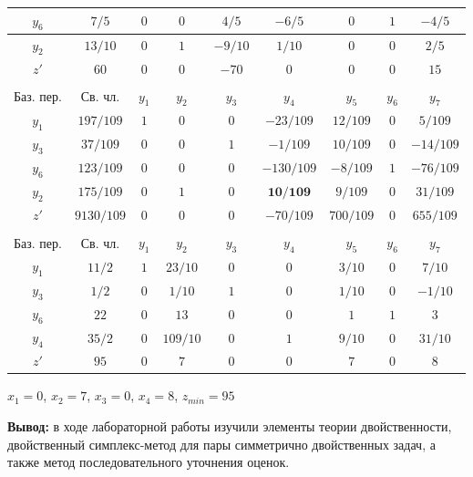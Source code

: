 \documentclass[a4paper,14pt]{extarticle}
\begin{document}
\begin{center}
\begin{longtable}{|c|c|c|c|c|c|c|c|c|}
        \hline
        $y_6$     & $7/5$      & $0$      & $0$      & $4/5$    & $-6/5$     & $0$       & $1$   & $-4/5$    \\
        \hline
        $y_2$     & $13/10$    & $0$      & $1$      & $-9/10$  & $1/10$     & $0$       & $0$   & $2/5$     \\
        \hline
        $z'$      & $60$       & $0$      & $0$      & $-70$    & $0$        & $0$       & $0$   & $15$      \\
        \hline
        \multicolumn{9}{c}{}                                                                                 \\
        \hline
        Баз. пер. & Св. чл.    & $y_1$    & $y_2$    & $y_3$    & $y_4 $     & $y_5$     & $y_6$ & $y_7$     \\
        \hline
        $y_1$     & $197/109$  & $1$      & $0$      & $0$      & $-23/109$  & $12/109$  & $0$   & $5/109$   \\
        \hline
        $y_3$     & $37/109$   & $0$      & $0$      & $1$      & $-1/109$   & $10/109$  & $0$   & $-14/109$ \\
        \hline
        $y_6$     & $123/109$  & $0$      & $0$      & $0$      & $-130/109$ & $-8/109$  & $1$   & $-76/109$ \\
        \hline
        $y_2$     & $175/109$  & $0$      & $1$      & $0$      & $\textbf{10/109}$   & $9/109$   & $0$   & $31/109$  \\
        \hline
        $z'$      & $9130/109$ & $0$      & $0$      & $0$      & $-70/109$  & $700/109$ & $0$   & $655/109$ \\
        \hline
        \multicolumn{9}{c}{}                                                                                 \\
        \hline
        Баз. пер. & Св. чл.    & $y_1$    & $y_2$    & $y_3$    & $y_4 $     & $y_5$     & $y_6$ & $y_7$     \\
        \hline
        $y_1$     & $11/2$     & $1$      & $23/10$  & $0$      & $0$  & $3/10$  & $0$   & $7/10$   \\
        \hline
        $y_3$     & $1/2$      & $0$      & $1/10$   & $1$      & $0$   & $1/10$  & $0$   & $-1/10$ \\
        \hline
        $y_6$     & $22$       & $0$      & $13$     & $0$      & $0$ & $1$  & $1$   & $3$ \\
        \hline
        $y_4$     & $35/2$     & $0$      & $109/10$ & $0$      & $1$   & $9/10$   & $0$   & $31/10$  \\
        \hline
        $z'$      & $95$       & $0$      & $7$      & $0$      & $0$  & $7$ & $0$   & $8$ \\
        \hline
    \end{longtable}
\end{center}

$x_1 = 0$, $x_2 = 7$, $x_3 = 0$, $x_4 = 8$, $z_{min} = 95$

\textbf{Вывод: } в ходе лабораторной работы изучили элементы теории двойственности, двойственный симплекс-метод
для пары симметрично двойственных задач, а также метод последовательного уточнения
оценок.
\end{document}
